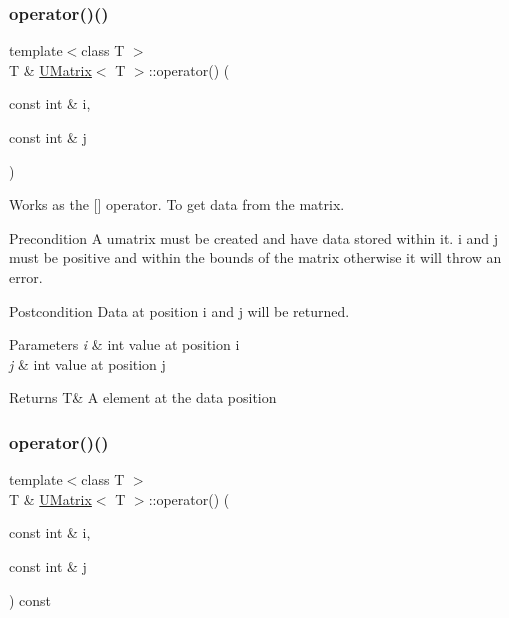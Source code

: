 \subsubsection{\texorpdfstring{operator()()}{operator()()}\hspace{0.1cm}{\footnotesize\ttfamily [1/2]}}
{\footnotesize\ttfamily template$<$class T $>$ \\
T \& \mbox{\hyperlink{class_u_matrix}{U\+Matrix}}$<$ T $>$\+::operator() (\begin{DoxyParamCaption}\item[{const int \&}]{i,  }\item[{const int \&}]{j }\end{DoxyParamCaption})}



Works as the \mbox{[}\mbox{]} operator. To get data from the matrix. 

\begin{DoxyPrecond}{Precondition}
A umatrix must be created and have data stored within it. i and j must be positive and within the bounds of the matrix otherwise it will throw an error. 
\end{DoxyPrecond}
\begin{DoxyPostcond}{Postcondition}
Data at position i and j will be returned.
\end{DoxyPostcond}

\begin{DoxyParams}{Parameters}
{\em i} & int value at position i \\
\hline
{\em j} & int value at position j \\
\hline
\end{DoxyParams}
\begin{DoxyReturn}{Returns}
T\& A element at the data position 
\end{DoxyReturn}
\mbox{\label{class_u_matrix_a2fbb6915ab1a6bb7a8944b51600b6d2d}} 
\subsubsection{\texorpdfstring{operator()()}{operator()()}\hspace{0.1cm}{\footnotesize\ttfamily [2/2]}}
{\footnotesize\ttfamily template$<$class T $>$ \\
T \& \mbox{\hyperlink{class_u_matrix}{U\+Matrix}}$<$ T $>$\+::operator() (\begin{DoxyParamCaption}\item[{const int \&}]{i,  }\item[{const int \&}]{j }\end{DoxyParamCaption}) const}



